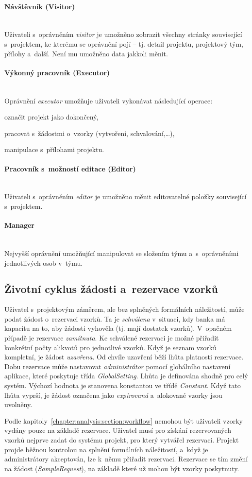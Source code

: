 \documentclass[11pt, final, oneside]{fithesis2}
\newcommand{\paragraphNewLine}[1]{\paragraph*{#1}\mbox{}\\}
\begin{document}
\paragraphNewLine{Návštěvník (Visitor)} 
Uživateli s~oprávněním \textit{visitor} je umožněno zobrazit všechny stránky související s~projektem, ke kterému se oprávnění pojí -- tj. detail projektu, projektový tým, přílohy a~další. Není mu umožněno data jakkoli měnit.

\paragraphNewLine{Výkonný pracovník (Executor)} 
Oprávnění \textit{executor} umožňuje uživateli vykonávat následující operace:
\begin{compactitem}
	\item označit projekt jako dokončený,
	\item pracovat s~žádostmi o~vzorky (vytvoření, schvalování,\ldots),
	\item manipulace s~přílohami projektu.
\end{compactitem}

\paragraphNewLine{Pracovník s~možností editace (Editor)}
Uživateli s~oprávněním \textit{editor} je umožněno měnit editovatelné položky související s~projektem.

\paragraphNewLine{Manager}
Nejvyšší oprávnění umožňující manipulovat se složením týmu a~s~oprávněními jednotlivých osob v~týmu.

\subsection{Životní cyklus žádosti a~rezervace vzorků}
Uživatel s~projektovým záměrem, ale bez splněných formálních náležitostí, může podat žádost o~rezervaci vzorků. Ta je \textit{schválena} v~situaci, kdy banka má kapacitu na to, aby žádosti vyhověla (tj. mají dostatek vzorků). V~opačném případě je rezervace \textit{zamítnuta}. Ke schválené rezervaci je možné přiřadit konkrétní počty alikvotů pro jednotlivé vzorků. Když je seznam vzorků kompletní, je žádost \textit{uzavřena}. Od chvíle uzavření běží lhůta platnosti rezervace. Dobu rezervace může nastavovat \textit{administrátor} pomocí globálního nastavení aplikace, které poskytuje třída \textit{GlobalSetting}. Lhůta je definována shodně pro celý systém. Výchozí hodnota je stanovena konstantou ve třídě \textit{Constant}. Když tato lhůta vyprší, je žádost označena jako \textit{expirovaná} a~alokované vzorky jsou uvolněny.

Podle kapitoly~\ref{chapter:analysis:section:workflow} nemohou být uživateli vzorky vydány pouze na základě rezervace. Uživatel musí pro získání rezervovaných vzorků nejprve zadat do systému projekt, pro který vytvářel rezervaci. Projekt projde běžnou kontrolou na splnění formálních náležitostí, a~když je administrátory akceptován, lze k~němu přiřadit rezervaci. Rezervace se tím změní na žádost (\textit{SampleRequest}), na základě které už mohou být vzorky poskytnuty.
\end{document}
